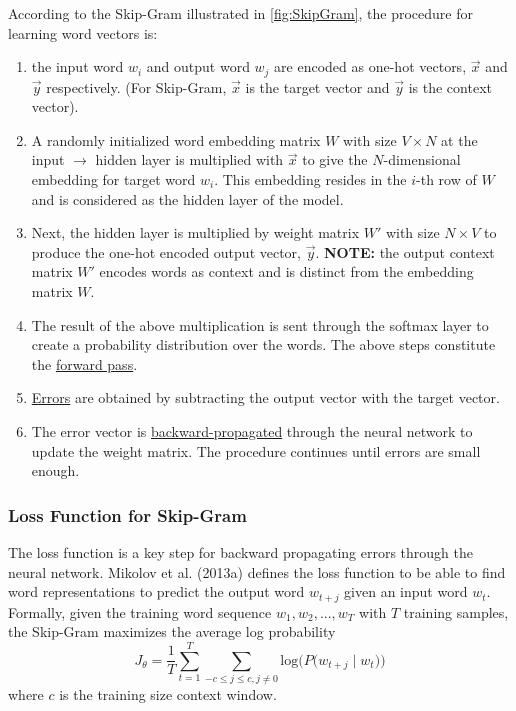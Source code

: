 According to the Skip-Gram illustrated in \cref{fig:SkipGram}, the procedure for learning word vectors is: 
\begin{enumerate}
    \item the input word $w_i$ and output word $w_j$ are encoded as one-hot vectors, $\overrightarrow{x}$ and $\overrightarrow{y}$ respectively. (For Skip-Gram, $\overrightarrow{x}$ is the target vector and $\overrightarrow{y}$ is the context vector). 
    
    \item A randomly initialized word embedding matrix $W$ with size $V \times N$ at the input $\rightarrow$ hidden layer is multiplied with $\overrightarrow{x}$ to give the $N$-dimensional embedding for target word $w_i$. This embedding resides in the $i$-th row of $W$ and is considered as the hidden layer of the model. 
    
    \item Next, the hidden layer is multiplied by weight matrix $W'$ with size $N \times V$ to produce the one-hot encoded output vector, $\overrightarrow{y}$. \textbf{NOTE: }the output context matrix $W'$ encodes words as context and is distinct from the embedding matrix $W$. 
    
    \item The result of the above multiplication is sent through the softmax layer to create a probability distribution over the words. The above steps constitute the \hyperref[sec:ForwardProp]{forward pass}.
    
    \item \hyperref[sec:ErrorCalc]{Errors} are obtained by subtracting the output vector with the target vector. 
    
    \item The error vector is \hyperref[sec:BackwardProp]{backward-propagated} through the neural network to update the weight matrix. The procedure continues until errors are small enough. 
    
\end{enumerate}


\subsubsection{Loss Function for Skip-Gram}

The loss function is a key step for backward propagating errors through the neural network. Mikolov et al. (2013a) defines the loss function to be able to find word representations to predict the output word $w_{t+j}$ given an input word $w_t$. Formally, given the training word sequence $w_1, w_2, ..., w_T$ with $T$ training samples, the Skip-Gram maximizes the average log probability
$$
J_\theta = \frac{1}{T} \sum_{t=1}^T \sum_{-c \leq j \leq c, j \neq 0} \text{log} \Big(P \Big(w_{t+j} \;| \; w_t \Big) \Big)
$$
where $c$ is the training size context window. 

